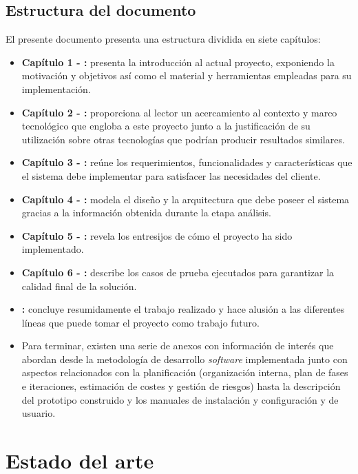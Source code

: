 \documentclass[12pt,a4paper, twoside]{report}
\begin{document}
	\section{Estructura del documento}

	El presente documento presenta una estructura dividida en siete capítulos: 
		
	\begin{itemize}
		\item \textbf{Capítulo 1 - :} presenta la introducción al actual proyecto, exponiendo la motivación y objetivos así como el material y herramientas empleadas para su implementación.		
		\item \textbf{Capítulo 2 - :} proporciona al lector un acercamiento al contexto y marco tecnológico que engloba a este proyecto junto a la justificación de su utilización sobre otras tecnologías que podrían producir resultados similares.		
		\item \textbf{Capítulo 3 - :} reúne los requerimientos, funcionalidades y características que el sistema debe implementar para satisfacer las necesidades del cliente.
		\item \textbf{Capítulo 4 - :} modela el diseño y la arquitectura que debe poseer el sistema gracias a la información obtenida durante la etapa análisis. 
		\item \textbf{Capítulo 5 - :} revela los entresijos de cómo el proyecto ha sido implementado.
		\item \textbf{Capítulo 6 - :} describe los casos de prueba ejecutados para garantizar la calidad final de la solución.
		\item \textbf{:} concluye resumidamente el trabajo realizado y hace alusión a las diferentes líneas que puede tomar el proyecto como trabajo futuro.	 
		\item Para terminar, existen una serie de anexos con información de interés que abordan desde la metodología de desarrollo \textit{software} implementada junto con aspectos relacionados con la planificación (organización interna, plan de fases e iteraciones, estimación de costes y gestión de riesgos) hasta la descripción del \gls{prototipo} construido y los manuales de instalación y configuración y de usuario.		
	\end{itemize}
	
	\chapter{Estado del arte} \label{stateArtChapter}
		
\end{document}
